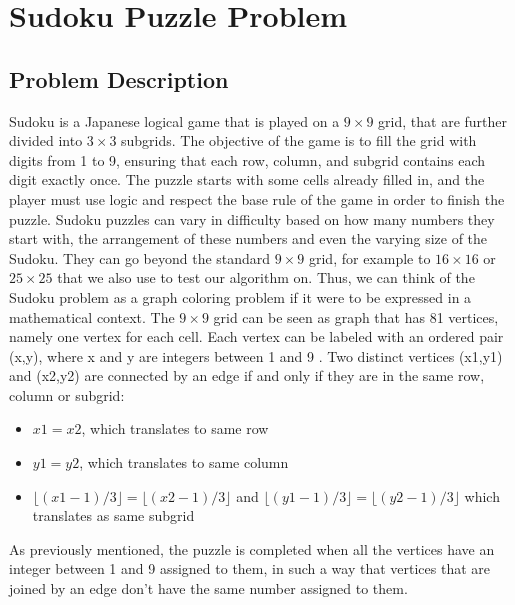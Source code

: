 \section{Sudoku Puzzle Problem}
\label{sec:problem_description}

\subsection{Problem Description}
{Sudoku is a Japanese logical game that is played on a $9 \times 9$ grid, that are further divided into $3 \times 3$ subgrids. The objective of the game is to fill the grid with digits from 1 to 9, ensuring that each row, column, and subgrid contains each digit exactly once\cite{Mantere2007}. The puzzle starts with some cells already filled in, and the player must use logic and respect the base rule of the game in order to finish the puzzle.}
{\newline}
{\newline Sudoku puzzles can vary in difficulty based on how many numbers they start with, the arrangement of these numbers and even the varying size of the Sudoku. They can go beyond the standard $9 \times 9$ grid, for example to $16 \times 16$ or $25 \times 25$ that we also use to test our algorithm on. Thus, we can think of the Sudoku problem as a graph coloring problem if it were to be expressed in a mathematical context. The $9 \times 9$ grid can be seen as graph that has 81 vertices, namely one vertex for each cell. Each vertex can be labeled with an ordered pair (x,y), where x and y are integers between 1 and 9 \cite{WikiMathematics}. Two distinct vertices (x1,y1) and (x2,y2) are connected by an edge if and only if they are in the same row, column or subgrid:}
\begin {itemize}
    \item $x1 = x2$, which translates to same row
    \item $y1 = y2$, which translates to same column
    \item $\lfloor (x1-1)/3 \rfloor = \lfloor (x2-1)/3 \rfloor$ and $\lfloor (y1-1)/3 \rfloor = \lfloor (y2-1)/3 \rfloor$ which translates as same subgrid
\end {itemize}
{As previously mentioned, the puzzle is completed when all the vertices have an integer between 1 and 9 assigned to them, in such a way that vertices that are joined by an edge don't have the same number assigned to them. }

